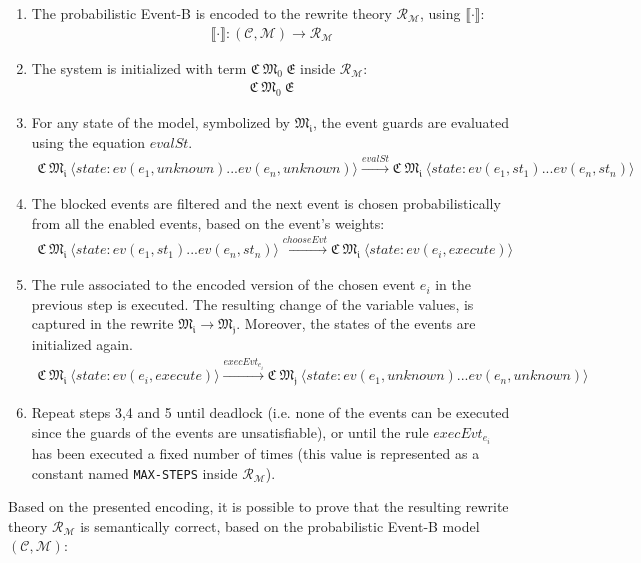 \begin{enumerate}
    \item The probabilistic Event-B is encoded to the rewrite theory $\mathscr{R}_\mathscr{M}$, using $\llbracket \cdot \rrbracket$:
    \begin{align*}
        \llbracket \cdot \rrbracket: (\mathscr{C}, \mathscr{M}) \rightarrow \mathscr{R}_\mathscr{M}
    \end{align*}
    \item The system is initialized with term $\mathfrak{C \ M_0 \ E}$ inside $\mathscr{R}_\mathscr{M}$:
    \begin{align*}
        \mathfrak{C \ M_0 \ E}
    \end{align*}
    \item For any state of the model, symbolized by $\mathfrak{M_i}$, the event guards are evaluated using the equation $evalSt$.
    \begin{align*}
        \mathfrak{C \ M_i} \ \langle state: ev(e_1,unknown) ... ev(e_n, unknown) \rangle \xrightarrow{evalSt} \mathfrak{C \ M_i} \ \langle state: ev(e_1,st_1) ... ev(e_n, st_n) \rangle
    \end{align*}
    \item The blocked events are filtered and the next event is chosen probabilistically from all the enabled events, based on the event's weights:
    \begin{align*}
        \mathfrak{C \ M_i} \ \langle state: ev(e_1,st_1) ... ev(e_n, st_n) \rangle \xrightarrow{chooseEvt} \mathfrak{C \ M_i} \ \langle state: ev(e_i,execute) \rangle
    \end{align*}
    \item The rule associated to the encoded version of the chosen event $e_i$ in the previous step is executed. The resulting change of the variable values, is captured in the rewrite $\mathfrak{M_i} \rightarrow \mathfrak{M_j}$. Moreover, the states of the events are initialized again. 
    \begin{align*}
        \mathfrak{C \ M_i} \ \langle state: ev(e_i,execute) \rangle \xrightarrow{execEvt_{e_i}} \mathfrak{C \ M_j} \ \langle state: ev(e_1,unknown) ... ev(e_n, unknown) \rangle
    \end{align*}
    \item Repeat steps 3,4 and 5 until deadlock (i.e. none of the events can be executed since the guards of the events are unsatisfiable), or until the rule $execEvt_{e_i}$ has been executed a fixed number of times (this value is represented as a constant named \texttt{MAX-STEPS} inside $\mathscr{R}_\mathscr{M}$).
\end{enumerate}
Based on the presented encoding, it is possible to prove that the resulting rewrite theory $\mathscr{R}_\mathscr{M}$ is semantically correct, based on the probabilistic Event-B model $(\mathscr{C}, \mathscr{M})$:

